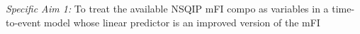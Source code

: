 \emph{Specific Aim 1:} To treat the available NSQIP mFI compo as variables in a time-to-event model whose linear predictor is an improved version of the mFI